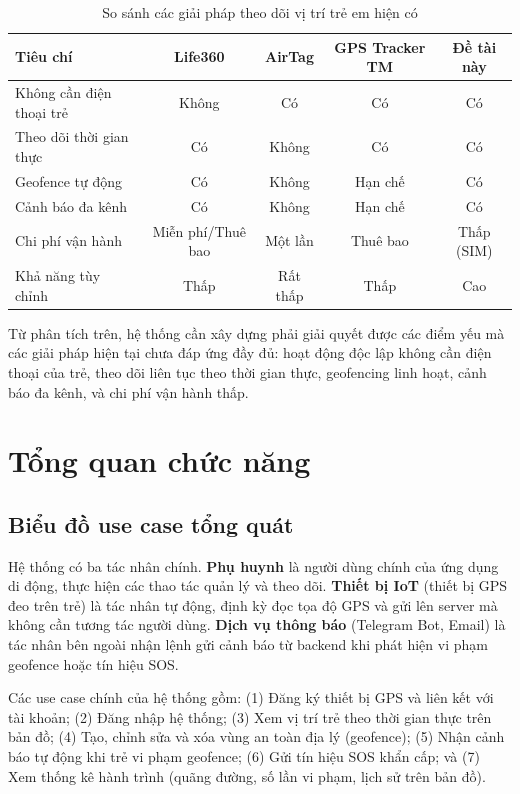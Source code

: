 \documentclass[../DoAn.tex]{subfiles}
\begin{document}
\begin{table}[H]
\centering
\caption{So sánh các giải pháp theo dõi vị trí trẻ em hiện có}
\label{table:comparison}
\begin{tabular}{|l|c|c|c|c|}
\hline
\textbf{Tiêu chí} & \textbf{Life360} & \textbf{AirTag} & \textbf{GPS Tracker TM} & \textbf{Đề tài này} \\
\hline
Không cần điện thoại trẻ    & Không & Có       & Có        & Có      \\
\hline
Theo dõi thời gian thực     & Có    & Không    & Có        & Có      \\
\hline
Geofence tự động            & Có    & Không    & Hạn chế   & Có      \\
\hline
Cảnh báo đa kênh            & Có    & Không    & Hạn chế   & Có      \\
\hline
Chi phí vận hành            & Miễn phí/Thuê bao & Một lần & Thuê bao & Thấp (SIM) \\
\hline
Khả năng tùy chỉnh          & Thấp  & Rất thấp & Thấp      & Cao     \\
\hline
\end{tabular}
\end{table}

Từ phân tích trên, hệ thống cần xây dựng phải giải quyết được các điểm yếu mà các giải pháp hiện tại chưa đáp ứng đầy đủ: hoạt động độc lập không cần điện thoại của trẻ, theo dõi liên tục theo thời gian thực, geofencing linh hoạt, cảnh báo đa kênh, và chi phí vận hành thấp.

\section{Tổng quan chức năng}
\label{section:2.2}

\subsection{Biểu đồ use case tổng quát}
\label{subsection:2.2.1}

Hệ thống có ba tác nhân chính. \textbf{Phụ huynh} là người dùng chính của ứng dụng di động, thực hiện các thao tác quản lý và theo dõi. \textbf{Thiết bị IoT} (thiết bị GPS đeo trên trẻ) là tác nhân tự động, định kỳ đọc tọa độ GPS và gửi lên server mà không cần tương tác người dùng. \textbf{Dịch vụ thông báo} (Telegram Bot, Email) là tác nhân bên ngoài nhận lệnh gửi cảnh báo từ backend khi phát hiện vi phạm geofence hoặc tín hiệu SOS.

Các use case chính của hệ thống gồm: (1) Đăng ký thiết bị GPS và liên kết với tài khoản; (2) Đăng nhập hệ thống; (3) Xem vị trí trẻ theo thời gian thực trên bản đồ; (4) Tạo, chỉnh sửa và xóa vùng an toàn địa lý (geofence); (5) Nhận cảnh báo tự động khi trẻ vi phạm geofence; (6) Gửi tín hiệu SOS khẩn cấp; và (7) Xem thống kê hành trình (quãng đường, số lần vi phạm, lịch sử trên bản đồ).
\end{document}
